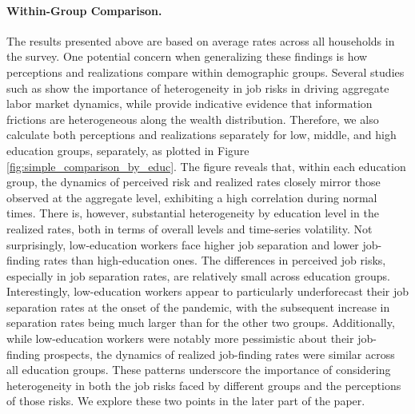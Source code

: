 \paragraph{Within-Group Comparison.} The results presented above are based on average rates across all households in the survey. One potential concern when generalizing these findings is how perceptions and realizations compare within demographic groups. Several studies such as \citet{hall2019job,gregory2021alpha,patterson2023matching} show the importance of heterogeneity in job risks in driving aggregate labor market dynamics, while \citet{broer2021information} provide indicative evidence that information frictions are heterogeneous along the wealth distribution. Therefore, we also calculate both perceptions and realizations separately for low, middle, and high education groups, separately, as plotted in Figure \ref{fig:simple_comparison_by_educ}. The figure reveals that, within each education group, the dynamics of perceived risk and realized rates closely mirror those observed at the aggregate level, exhibiting a high correlation during normal times. There is, however, substantial heterogeneity by education level in the realized rates, both in terms of overall levels and time-series volatility. Not surprisingly, low-education workers face higher job separation and lower job-finding rates than high-education ones. The differences in perceived job risks, especially in job separation rates, are relatively small across education groups. Interestingly, low-education workers appear to particularly underforecast their job separation rates at the onset of the pandemic, with the subsequent increase in separation rates being much larger than for the other two groups. Additionally, while low-education workers were notably more pessimistic about their job-finding prospects, the dynamics of realized job-finding rates were similar across all education groups. These patterns underscore the importance of considering heterogeneity in both the job risks faced by different groups and the perceptions of those risks. We explore these two points in the later part of the paper. 

